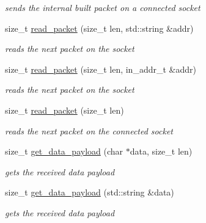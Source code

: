 \begin{CompactItemize}
\begin{CompactList}\small\item\em sends the internal built packet on a connected socket \item\end{CompactList}\item 
size\_\-t \hyperlink{classsocketpp_1_1RawSocket_1564181b6422fb3918c419051b34ae2d}{read\_\-packet} (size\_\-t len, std::string \&addr)
\begin{CompactList}\small\item\em reads the next packet on the socket \item\end{CompactList}\item 
size\_\-t \hyperlink{classsocketpp_1_1RawSocket_08b8bec945928764f2d7ee11890b8625}{read\_\-packet} (size\_\-t len, in\_\-addr\_\-t \&addr)
\begin{CompactList}\small\item\em reads the next packet on the socket \item\end{CompactList}\item 
size\_\-t \hyperlink{classsocketpp_1_1RawSocket_ea48bec4596e2afc89adba2ccb13f6c8}{read\_\-packet} (size\_\-t len)
\begin{CompactList}\small\item\em reads the next packet on the connected socket \item\end{CompactList}\item 
size\_\-t \hyperlink{classsocketpp_1_1RawSocket_bd9631abfa5165ad4ed9e2a31640d1f0}{get\_\-data\_\-payload} (char $\ast$data, size\_\-t len)
\begin{CompactList}\small\item\em gets the received data payload \item\end{CompactList}\item 
size\_\-t \hyperlink{classsocketpp_1_1RawSocket_de47c63d60cba25d1ae82f242851610d}{get\_\-data\_\-payload} (std::string \&data)
\begin{CompactList}\small\item\em gets the received data payload \item\end{CompactList}\end{CompactItemize}
